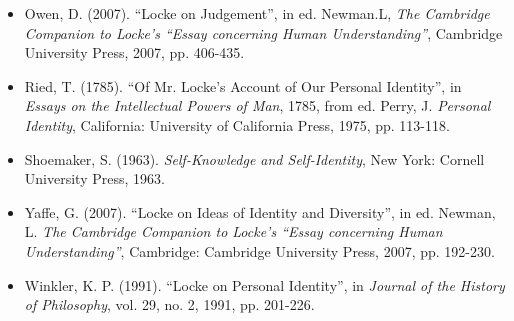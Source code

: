 \documentclass[a4j,oneside]{jsbook}
\begin{document}
\begin{itemize}
\item{} Owen, D. (2007). “Locke on Judgement”, in ed. Newman.L, {\itshape The Cambridge Companion to Locke's “Essay concerning Human Understanding”}, Cambridge University Press, 2007, pp. 406-435.
\item{} Ried, T. (1785). “Of Mr. Locke’s Account of Our Personal Identity”, in {\itshape Essays on the Intellectual Powers of Man}, 1785,  from ed. Perry, J. {\itshape Personal Identity}, California: University of California Press, 1975, pp. 113-118.
\item{} Shoemaker, S. (1963). {\itshape Self-Knowledge and Self-Identity}, New York: Cornell University Press, 1963.
\item{} Yaffe, G. (2007). “Locke on Ideas of Identity and Diversity”, in ed. Newman, L. {\itshape The Cambridge Companion to Locke's “Essay concerning Human Understanding”}, Cambridge: Cambridge University Press, 2007, pp. 192-230.
\item{} Winkler, K. P. (1991). “Locke on Personal Identity”, in {\itshape Journal of the History of Philosophy}, vol. 29, no. 2, 1991, pp. 201-226.
\end{itemize}
\end{document}

